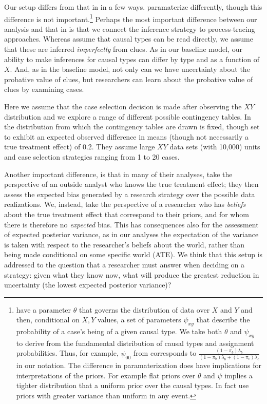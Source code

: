 \documentclass[
  12pt,
]{book}
\begin{document}
Our setup differs from that in \citet{HerronQuinn} in a few ways. \citet{HerronQuinn} paramaterize differently, though this difference is not important.\footnote{\citet{HerronQuinn} have a parameter \(\theta\) that governs the distribution of data over \(X\) and \(Y\) and then, conditional on \(X,Y\) values, a set of parameters \(\psi_{xy}\) that describe the probability of a case's being of a given causal type. We take both \(\theta\) and \(\psi_{xy}\) to derive from the fundamental distribution of causal types and assignment probabilities. Thus, for example, \(\psi_{00}\) from \citet{HerronQuinn} corresponds to \(\frac{(1-\pi_b)\lambda_b}{(1-\pi_b)\lambda_b + (1-\pi_c)\lambda_c}\) in our notation. The difference in paramaterization does have implications for interpretations of the priors. For example flat priors over \(\theta\) and \(\psi\) implies a tighter distribution that a uniform prior over the causal types. In fact \citet{HerronQuinn} use priors with greater variance than uniform in any event.} Perhaps the most important difference between our analysis and that in \citet{HerronQuinn} is that we connect the inference strategy to process-tracing approaches. Whereas \citet{HerronQuinn} assume that causal types can be read directly, we assume that these are inferred \emph{imperfectly} from clues. As in our baseline model, our ability to make inferences for causal types can differ by type and as a function of \(X\). And, as in the baseline model, not only can we have uncertainty about the probative value of clues, but researchers can learn about the probative value of clues by examining cases.

Here we assume that the case selection decision is made after observing the \(XY\) distribution and we explore a range of different possible contingency tables. In \citet{HerronQuinn} the distribution from which the contingency tables are drawn is fixed, though set to exhibit an expected observed difference in means (though not necessarily a true treatment effect) of 0.2. They assume large \(XY\) data sets (with 10,000) units and case selection strategies ranging from 1 to 20 cases.

Another important difference, is that in many of their analyses, \citet{HerronQuinn} take the perspective of an outside analyst who knows the true treatment effect; they then assess the expected bias generated by a research strategy over the possible data realizations. We, instead, take the perspective of a researcher who has \emph{beliefs} about the true treatment effect that correspond to their priors, and for whom there is therefore no \emph{expected} bias. This has consequences also for the assessment of expected posterior variance, as in our analyses the expectation of the variance is taken with respect to the researcher's beliefs about the world, rather than being made conditional on some specific world (ATE). We think that this setup is addressed to the question that a researcher must answer when deciding on a strategy: given what they know now, what will produce the greatest reduction in uncertainty (the lowest expected posterior variance)?
\end{document}
